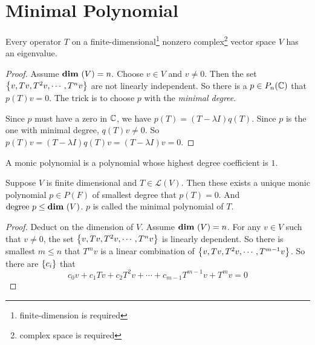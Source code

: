 \section{Minimal Polynomial}\label{minimal_polynomial}

\begin{theorem}
    Every operator $T$ on a finite-dimensional\footnote{finite-dimension is required} nonzero complex\footnote{complex space is required} vector space $V$ has an eigenvalue.
\end{theorem}
\begin{proof}
    Assume $\dimension{V} = n$. Choose $v \in V$ and $v \neq 0$. Then the set $\set{v, Tv, T^2v, \cdots, T^nv}$ are not linearly independent. So there is a $p \in P_n(\mathbb{C})$ that $p(T) v = 0$. The trick is to choose $p$ with the \emph{minimal degree}.
    
    
    Since $p$ must have a zero in $\mathbb{C}$, we have $p(T) = (T - \lambda I) q(T)$. Since $p$ is the one with minimal degree, $q(T)v \neq 0$. So $p(T) v = (T - \lambda I) q(T) v = (T - \lambda I) v = 0$.
\end{proof}

\begin{definition}
    A monic polynomial is a polynomial whose highest degree coefficient is $1$.
\end{definition}

\begin{theorem}
    Suppose $V$ is finite dimensional and $T \in \mathcal{L}(V)$. Then these exists a unique monic polynomial $p\in P(F)$ of smallest degree that $p(T) = 0$. And $\text{degree }p \leq \dimension{V}$. $p$ is called the minimal polynomial of $T$. 
\end{theorem}
\begin{proof}
    Deduct on the dimension of $V$. Assume $\dimension{V} = n$. For any $v \in V$ such that $v \neq 0$, the set $\set{v, Tv, T^2v, \cdots, T^n v}$ is linearly dependent. So there is smallest $m \leq n$ that $T^m v$ is a linear combination of $\set{v, Tv, T^2v, \cdots, T^{m-1} v}$. So there are $\set{c_i}$ that
    \begin{equation*}
        c_0 v + c_1 Tv + c_2 T^2 v + \cdots + c_{m-1} T^{m-1} v + T^m v = 0
    \end{equation*}
\end{proof}








































